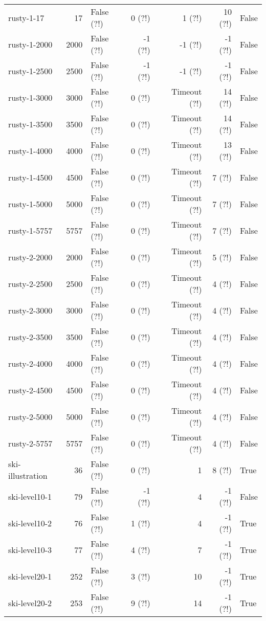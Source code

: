 \begin{longtable}{lrlrrrl}
rusty-1-17 & 17 & False (?!) & 0 (?!) & 1 (?!) & 10 (?!) & False \\
rusty-1-2000 & 2000 & False (?!) & -1 (?!) & -1 (?!) & -1 (?!) & False \\
rusty-1-2500 & 2500 & False (?!) & -1 (?!) & -1 (?!) & -1 (?!) & False \\
rusty-1-3000 & 3000 & False (?!) & 0 (?!) & Timeout (?!) & 14 (?!) & False \\
rusty-1-3500 & 3500 & False (?!) & 0 (?!) & Timeout (?!) & 14 (?!) & False \\
rusty-1-4000 & 4000 & False (?!) & 0 (?!) & Timeout (?!) & 13 (?!) & False \\
rusty-1-4500 & 4500 & False (?!) & 0 (?!) & Timeout (?!) & 7 (?!) & False \\
rusty-1-5000 & 5000 & False (?!) & 0 (?!) & Timeout (?!) & 7 (?!) & False \\
rusty-1-5757 & 5757 & False (?!) & 0 (?!) & Timeout (?!) & 7 (?!) & False \\
rusty-2-2000 & 2000 & False (?!) & 0 (?!) & Timeout (?!) & 5 (?!) & False \\
rusty-2-2500 & 2500 & False (?!) & 0 (?!) & Timeout (?!) & 4 (?!) & False \\
rusty-2-3000 & 3000 & False (?!) & 0 (?!) & Timeout (?!) & 4 (?!) & False \\
rusty-2-3500 & 3500 & False (?!) & 0 (?!) & Timeout (?!) & 4 (?!) & False \\
rusty-2-4000 & 4000 & False (?!) & 0 (?!) & Timeout (?!) & 4 (?!) & False \\
rusty-2-4500 & 4500 & False (?!) & 0 (?!) & Timeout (?!) & 4 (?!) & False \\
rusty-2-5000 & 5000 & False (?!) & 0 (?!) & Timeout (?!) & 4 (?!) & False \\
rusty-2-5757 & 5757 & False (?!) & 0 (?!) & Timeout (?!) & 4 (?!) & False \\
ski-illustration & 36 & False (?!) & 0 (?!) & 1 & 8 (?!) & True \\
ski-level10-1 & 79 & False (?!) & -1 (?!) & 4 & -1 (?!) & False \\
ski-level10-2 & 76 & False (?!) & 1 (?!) & 4 & -1 (?!) & True \\
ski-level10-3 & 77 & False (?!) & 4 (?!) & 7 & -1 (?!) & True \\
ski-level20-1 & 252 & False (?!) & 3 (?!) & 10 & -1 (?!) & True \\
ski-level20-2 & 253 & False (?!) & 9 (?!) & 14 & -1 (?!) & True \\

\end{longtable}
